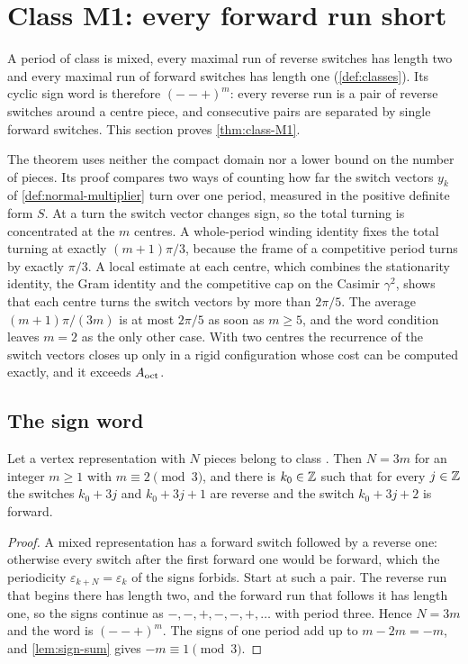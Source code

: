 \section{Class M1: every forward run short}\label{sec:short-runs}

A period of class  is mixed, every maximal run of reverse switches has length two and
every maximal run of forward switches has length one (\cref{def:classes}). Its cyclic sign word is
therefore $(--+)^m$: every reverse run is a pair of reverse switches around a centre piece, and
consecutive pairs are separated by single forward switches. This section proves \cref{thm:class-M1}.



The theorem uses neither the compact domain nor a lower bound on the number of pieces. Its proof
compares two ways of counting how far the switch vectors $y_k$ of \cref{def:normal-multiplier}
turn over one period, measured in the positive definite form $S$. At a turn the switch vector
changes sign, so the total turning is concentrated at the $m$ centres. A whole-period winding
identity fixes the total turning at exactly $(m+1)\pi/3$, because the frame of a competitive
period turns by exactly $\pi/3$. A local estimate at each centre, which combines the stationarity
identity, the Gram identity and the competitive cap on the Casimir $\gamma^2$, shows that each
centre turns the switch vectors by more than $2\pi/5$. The average $(m+1)\pi/(3m)$ is at most
$2\pi/5$ as soon as $m\ge5$, and the word condition leaves $m=2$ as the only other case. With two
centres the recurrence of the switch vectors closes up only in a rigid configuration whose cost
can be computed exactly, and it exceeds $A_{\mathrm{oct}}$.

\subsection{The sign word}

\begin{lemma}\label{lem:m1-pattern}
  Let a vertex representation with $N$ pieces belong to class . Then $N=3m$ for an integer
  $m\ge1$ with $m\equiv2\pmod 3$, and there is $k_0\in\mathbb{Z}$ such that for every $j\in\mathbb{Z}$ the
  switches $k_0+3j$ and $k_0+3j+1$ are reverse and the switch $k_0+3j+2$ is forward.
\end{lemma}

\begin{proof}
  A mixed representation has a forward switch followed by a reverse one: otherwise every switch
  after the first forward one would be forward, which the periodicity $\varepsilon_{k+N}=\varepsilon_k$
  of the signs forbids. Start at such a pair. The reverse run that begins there has length two,
  and the forward run that follows it has length one, so the signs continue as
  $-,-,+,-,-,+,\dots$ with period three. Hence $N=3m$ and the word is $(--+)^m$. The signs of one
  period add up to $m-2m=-m$, and \cref{lem:sign-sum} gives $-m\equiv1\pmod3$.
\end{proof}

